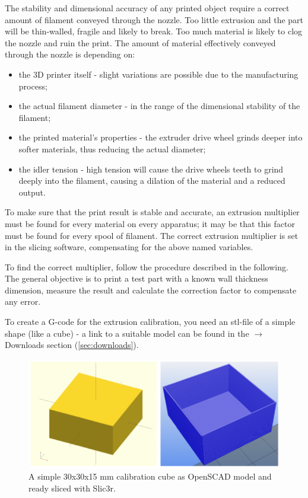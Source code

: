The stability and dimensional accuracy of any printed object require a correct amount of filament conveyed through the nozzle. Too little extrusion and the part will be thin-walled, fragile and likely to break. Too much material is likely to clog the nozzle and ruin the print. The amount of material effectively conveyed through the nozzle is depending on: 

\begin{itemize}
  \item the 3D printer itself - slight variations are possible due to the manufacturing 
        process;
  \item the actual filament diameter - in the range of the dimensional stability of the 
        filament;
  \item the printed material's properties - the extruder drive wheel grinds deeper into 
        softer materials, thus reducing the actual diameter;
  \item the idler tension - high tension will cause the drive wheels teeth to grind deeply 
        into the filament, causing a dilation of the material and a reduced output.
\end{itemize}

To make sure that the print result is stable and accurate, an extrusion multiplier must be found for every material on every apparatus; it may be that this factor must be found for every spool of filament.
The correct extrusion multiplier is set in the slicing software, compensating for the above named variables.

To find the correct multiplier, follow the procedure described in the following. The general objective is to print a test part with a known wall thickness dimension, measure the result and calculate the correction factor to compensate any error.

To create a G-code for the extrusion calibration, you need an stl-file of a simple shape (like a cube) - a link to a suitable model can be found in the $\rightarrow$ Downloads section (\ref{sec:downloads}).

\begin{figure}[H]
  \centering
  \includegraphics[width=.7\linewidth]{./img/tt_calibrateextrusion_cubeprepost.png}
  \caption{A simple 30x30x15 mm calibration cube as OpenSCAD model and ready sliced with Slic3r.}
\end{figure}

